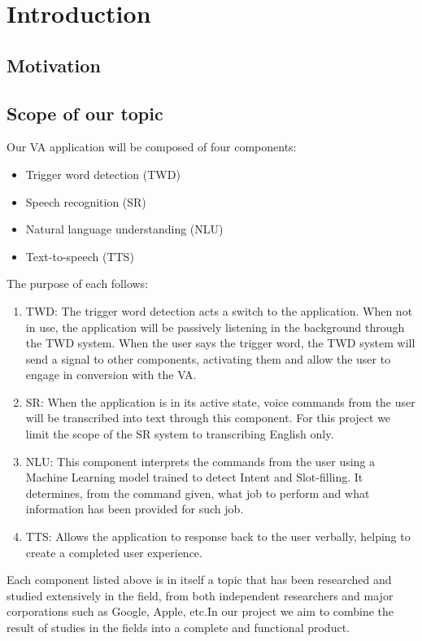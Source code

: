 \chapter{Introduction}
    
\section{Motivation}

\section{Scope of our topic}
    Our VA application will be composed of four components:
    \begin{itemize}
        \item Trigger word detection (TWD)
        \item Speech recognition (SR)
        \item Natural language understanding (NLU)
        \item Text-to-speech (TTS)
    \end{itemize}
    The purpose of each follows:
    \begin{enumerate}
        \item TWD: The trigger word detection acts a switch to the application. When not in use, the application will be passively listening in the background through the TWD system. When the user says the trigger word, the TWD system will send a signal to other components, activating them and allow the user to engage in conversion with the VA.
        \item SR: When the application is in its active state, voice commands from the user will be transcribed into text through this component. For this project we limit the scope of the SR system to transcribing English only.
        \item NLU: This component interprets the commands from the user using a Machine Learning model trained to detect Intent and Slot-filling. It determines, from the command given, what job to perform and what information has been provided for such job.
        \item TTS: Allows the application to response back to the user verbally, helping to create a completed user experience.
    \end{enumerate}
    
    Each component listed above is in itself a topic that has been researched and studied extensively in the field, from both independent researchers and major corporations such as Google, Apple, etc.In our project we aim to combine the result of studies in the fields into a complete and functional product.
    
